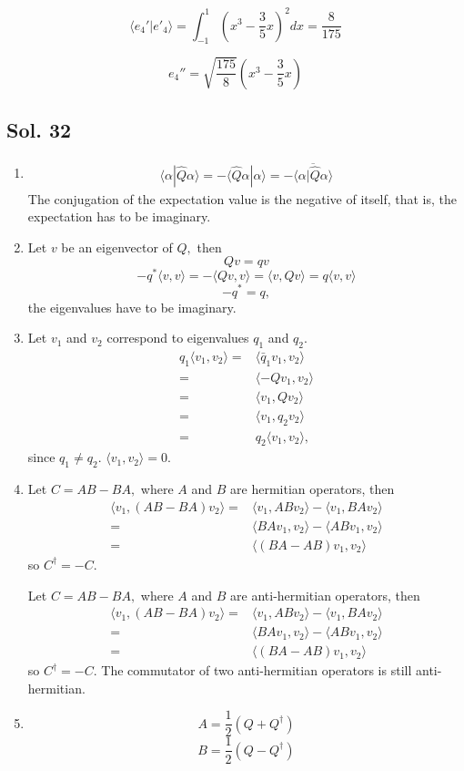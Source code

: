 $$
\langle e_4'|e'_4\rangle
=\int_{-1}^1
(x^3-\frac{3}{5}x)^2dx
=\frac{8}{175}
$$

$$
e_4''=\sqrt{\frac{175}{8}}(x^3-\frac{3}{5}x)
$$


\subsection*{Sol. 32}
\begin{enumerate}
    \item 
    \begin{align*}
        \langle \alpha|\hat{Q}\alpha\rangle = 
        -\langle\hat{Q}\alpha|\alpha\rangle=
        -\overline{\langle\alpha|\hat{Q}\alpha\rangle}
    \end{align*}
    The conjugation of the expectation value is the negative of itself, that is, the expectation has to be imaginary.
    \item 
    Let $v$ be an eigenvector of $Q,$ then 
    $$
    Qv=qv
    $$
    $$
   -q^*\langle v,v\rangle =-\langle Qv,v\rangle = \langle v,Qv\rangle
    =q\langle v,v\rangle
    $$
    $$
    -q^*=q,
    $$
    the eigenvalues have to be imaginary.
    \item Let $v_1$ and $v_2$ correspond to eigenvalues $q_1$ and $q_2.$
    \begin{align*}
        q_1\langle v_1,v_2\rangle
        =&\langle \bar{q}_1v_1,v_2\rangle\\
        =&\langle -Qv_1,v_2\rangle\\
        =&\langle v_1,Qv_2\rangle\\
        =&\langle v_1,q_2v_2\rangle\\
         =&q_2\langle v_1,v_2\rangle,
    \end{align*}
    since $q_1\neq q_2.$ $\langle v_1,v_2\rangle=0.$
    \item 
    Let $C=AB-BA,$ where $A$ and $B$ are hermitian operators, then 
    \begin{align*}
        \langle v_1, (AB-BA)v_2\rangle = 
    &
    \langle v_1,ABv_2\rangle
    -\langle v_1, BAv_2\rangle\\
    =&\langle BAv_1,v_2\rangle
    -\langle ABv_1, v_2\rangle\\
    =&
    \langle (BA-AB)v_1, v_2\rangle
    \end{align*}
    so $C^\dagger = -C.$


    Let $C=AB-BA,$ where $A$ and $B$ are anti-hermitian operators, then 
    \begin{align*}
        \langle v_1, (AB-BA)v_2\rangle = 
    &
    \langle v_1,ABv_2\rangle
    -\langle v_1, BAv_2\rangle\\
    =&\langle BAv_1,v_2\rangle
    -\langle ABv_1, v_2\rangle\\
    =&
    \langle (BA-AB)v_1, v_2\rangle
    \end{align*}
    so $C^\dagger = -C.$
    The commutator of two anti-hermitian operators is still anti-hermitian.
    \item 
    $$
    A = \frac{1}{2}(Q+Q^\dagger)
    $$
    $$
    B = \frac{1}{2}(Q-Q^\dagger)
    $$
\end{enumerate}


